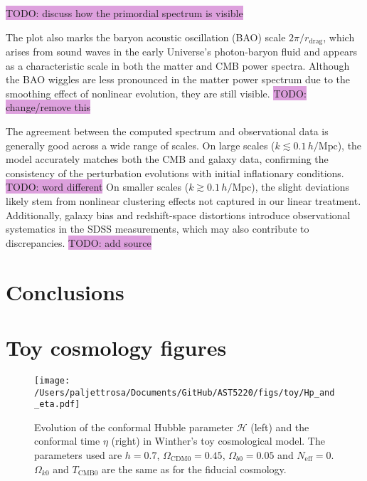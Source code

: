 \documentclass{aa}
\numberwithin{equation}{section}
\numberwithin{table}{section}
\numberwithin{figure}{section}
\begin{document}
\colorbox{Plum}{TODO: discuss how the primordial spectrum is visible}

The plot also marks the baryon acoustic oscillation (BAO) scale $2\pi/r_\text{drag}$, which arises from sound waves in the early Universe's photon-baryon fluid and appears as a characteristic scale in both the matter and CMB power spectra. Although the BAO wiggles are less pronounced in the matter power spectrum due to the smoothing effect of nonlinear evolution, they are still visible. \colorbox{Plum}{TODO: change/remove this}

The agreement between the computed spectrum and observational data is generally good across a wide range of scales. On large scales ($k \lesssim 0.1\,h/\text{Mpc}$), the model accurately matches both the CMB and galaxy data, confirming the consistency of the perturbation evolutions with initial inflationary conditions. \colorbox{Plum}{TODO: word different} On smaller scales ($k \gtrsim 0.1\,h/\text{Mpc}$), the slight deviations likely stem from nonlinear clustering effects not captured in our linear treatment. Additionally, galaxy bias and redshift-space distortions introduce observational systematics in the SDSS measurements, which may also contribute to discrepancies. \colorbox{Plum}{TODO: add source}




\section{Conclusions}\label{sec: conclusions}


\appendix

\onecolumn

\section{Toy cosmology figures}\label{appsec: figures}
\begin{figure}[h!]
  \centering
  \texttt{[image: /Users/paljettrosa/Documents/GitHub/AST5220/figs/toy/Hp\_and\_eta.pdf]}
  \caption{Evolution of the conformal Hubble parameter $\mathcal{H}$ (left) and the conformal time $\eta$ (right) in Winther's toy cosmological model. The parameters used are $h=0.7$, $\Omega_{\text{CDM}0}=0.45$, $\Omega_{b0}=0.05$ and $N_\text{eff}=0$. $\Omega_{k0}$ and $T_\text{CMB0}$ are the same as for the fiducial cosmology.}\label{appfig: Hp_and_eta}
  \vspace{-15pt}
\end{figure}
\end{document}
